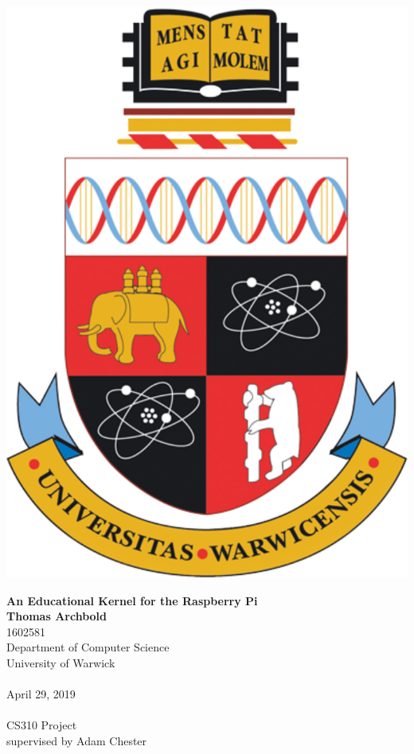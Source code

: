 \documentclass[10pt,a4paper]{article}
\begin{document}
\begin{titlepage}
    \begin{center}

        \vspace*{2cm}
        \includegraphics[width=.25\textwidth]{crest.png}

        \vspace*{1cm}
        {\Large \textbf{An Educational Kernel for the Raspberry Pi}} \\

        \vspace*{1cm}
        \textbf{Thomas Archbold} \\
        1602581 \\
        Department of Computer Science \\
        University of Warwick \\~\\


        April 29, 2019 \\~\\

        CS310 Project \\
        supervised by Adam Chester \\~\\

        \vfill

    \end{center}
\end{titlepage}



\tableofcontents






%
%
%    
%    
%
%    
%    
%    
%
\end{document}
